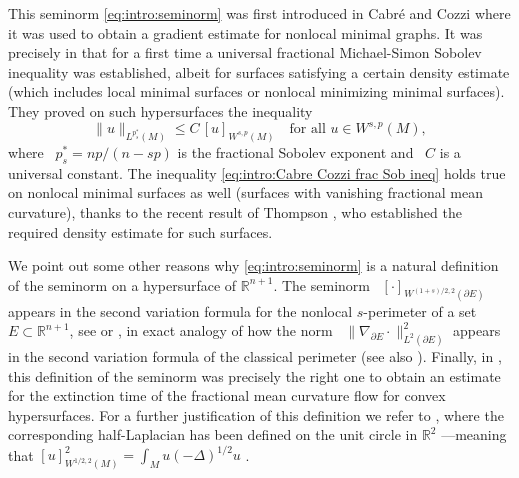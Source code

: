 \documentclass[reqno,12pt]{amsart}
\newcommand{\R}{\mathbb{R}}
\numberwithin{equation}{section}
\theoremstyle{plain}
\theoremstyle{definition}
\renewcommand{\leq}{\leqslant}
\begin{document}
This seminorm \eqref{eq:intro:seminorm} was first introduced in Cabr\'e and Cozzi \cite{Cabre-Cozzi} where it was used to obtain a gradient estimate for nonlocal minimal graphs. It was precisely in \cite[Proposition 5.2]{Cabre-Cozzi} that for a first time a universal fractional Michael-Simon Sobolev inequality was established, albeit for surfaces satisfying a certain density estimate (which includes local minimal surfaces or nonlocal minimizing minimal surfaces). They proved on such hypersurfaces the inequality
\begin{equation}
 \label{eq:intro:Cabre Cozzi frac Sob ineq}
  \|u\|_{L^{p^{\ast}_s}(M)}\leq C \, [u]_{W^{s,p}(M)}\quad\text{for all } u\in W^{s, p}(M),
\end{equation}
where ~$p_s^*=np/(n-sp)$ is the fractional Sobolev exponent and ~$C$ is a universal constant. The inequality \eqref{eq:intro:Cabre Cozzi frac Sob ineq} holds true on nonlocal minimal surfaces as well (surfaces with vanishing fractional mean curvature), thanks to the recent result of Thompson \cite{Thompson}, who established the required density estimate for such surfaces. 


We point out some other reasons why \eqref{eq:intro:seminorm} is a natural definition of the seminorm on a hypersurface of $\R^{n+1}$. The seminorm ~$[\cdot]_{W^{(1+s)/2,2}(\partial E)}$ appears in the second variation formula for the nonlocal  $s$-perimeter of a set $E\subset \R^{n+1}$, see \cite[Appendix B]{LawsonCones} or \cite[Section 6]{FFMMM}, in exact analogy of how the norm ~$\|\nabla_{\partial E} \cdot\|_{L^2(\partial E)}^2$ appears in the second variation formula of the classical perimeter (see also \cite[Section 6]{FFMMM}). Finally, in  \cite{Cabre-Cozzi-Csato}, this definition of the seminorm was precisely the right one to obtain an estimate for the extinction time of the fractional mean curvature flow for convex hypersurfaces. For a further justification of this definition we refer to  \cite[Appendix A]{CabreCsatoMas}, where the corresponding half-Laplacian has been defined on the unit circle in $\R^2$ ---meaning that $[u]_{W^{1/2,2}(M)}^2=\int_M u (-\Delta)^{1/2}u$ .
\end{document}
